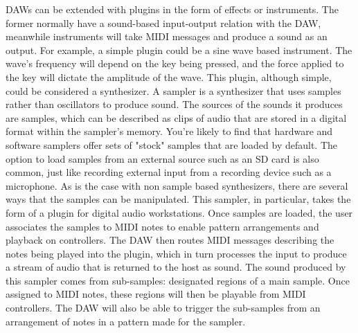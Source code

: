 \documentclass[12pt, a4paper, hidelinks]{article}
\begin{document}
	DAWs can be extended with plugins in the form of effects or instruments. The former normally have a sound-based input-output relation with the DAW, meanwhile instruments will take MIDI messages and produce a sound as an output. For example, a simple plugin could be a sine wave based instrument. The wave's frequency will depend on the key being pressed, and the force applied to the key will dictate the amplitude of the wave. This plugin, although simple, could be considered a synthesizer. A sampler is a synthesizer that uses samples rather than oscillators to produce sound.  The sources of the sounds it produces are samples, which can be described as clips of audio that are stored in a digital format within the sampler's memory. You're likely to find that hardware and software samplers offer sets of "stock" samples that are loaded by default. The option to load samples from an external source such as an SD card is also common, just like recording external input from a recording device such as a microphone. As is the case with non sample based synthesizers, there are several ways that the samples can be manipulated. This sampler, in particular, takes the form of a plugin for digital audio workstations. Once samples are loaded, the user associates the samples to MIDI notes to enable pattern arrangements and playback on controllers. The DAW then routes MIDI messages describing the notes being played into the plugin, which in turn processes the input to produce a stream of audio that is returned to the host as sound. The sound produced by this sampler comes from sub-samples: designated regions of a main sample. Once assigned to MIDI notes, these regions will then be playable from MIDI controllers. The DAW will also be able to trigger the sub-samples from an arrangement of notes in a pattern made for the sampler.\par 
	
\end{document}
